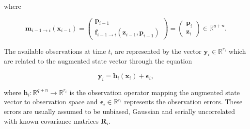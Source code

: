\documentclass[review]{elsarticle}
\begin{document}
where
\begin{linenomath}
\begin{equation}
\textbf{m}_{i-1\rightarrow i}(\textbf{x}_{i-1}) =
\begin{pmatrix}
\textbf{p}_{i-1} \\
\textbf{f}_{i-1\rightarrow i}(\textbf{z}_{i-1}, \textbf{p}_{i-1})
\end{pmatrix}
=
\begin{pmatrix}
\textbf{p}_{i} \\
\textbf{z}_{i}
\end{pmatrix}
\in \mathbb{R}^{q+n}.
\end{equation}
\end{linenomath}
The available observations at time $t_{i}$ are represented by the vector $\textbf{y}_{i} \in \mathbb{R}^{r_{i}}$ which are related to the augmented state vector through the equation
\begin{linenomath}
\begin{equation}
\textbf{y}_{i}=\textbf{h}_{i}(\textbf{x}_{i})+ \mathbf{ \epsilon}_{i},
\end{equation} 
\end{linenomath}
where $\textbf{h}_{i}: \mathbb{R}^{q+n} \rightarrow \mathbb{R}^{r_{i}}$ is the observation operator mapping the augmented state vector to observation space and $\mathbf{\epsilon}_{i} \in \mathbb{R}^{r_{i}}$ represents the observation errors. These errors are usually assumed to be unbiased, Gaussian and serially uncorrelated with known covariance matrices $\textbf{R}_{i}$.
\end{document}
